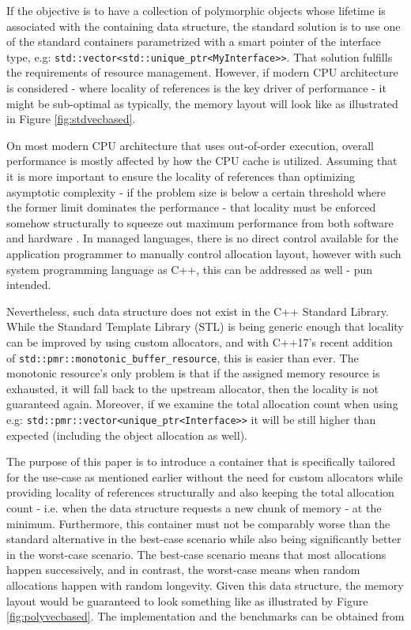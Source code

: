 \documentclass[a4paper,12pt]{article}
\begin{document}

If the objective is to have a collection of polymorphic objects whose lifetime is associated with the containing data structure, the standard solution is to use one of the standard containers parametrized with a smart pointer of the interface type, e.g: \lstinline{std::vector<std::unique_ptr<MyInterface>>}. That solution fulfills the requirements of resource management. However, if modern CPU architecture is considered - where locality of references is the key driver of performance - it might be sub-optimal as typically, the memory layout will look like as illustrated in Figure \ref{fig:stdvecbased}.

On most modern CPU architecture that uses out-of-order execution, overall performance is mostly affected by how the CPU cache is utilized. Assuming that it is more important to ensure the locality of references than optimizing asymptotic complexity - if the problem size is below a certain threshold where the former limit dominates the performance - that locality must be enforced somehow structurally to squeeze out maximum performance from both software and hardware \cite{cache_line_aware_datastructs}. In managed languages, there is no direct control available for the application programmer to manually control allocation layout, however with such system programming language as C++, this can be addressed as well - pun intended. 

Nevertheless, such data structure does not exist in the C++ Standard Library. While the Standard Template Library (STL) is being generic enough that locality can be improved by using custom allocators, and with C++17's recent addition of \lstinline{std::pmr::monotonic_buffer_resource}, this is easier than ever. The monotonic resource's only problem is that if the assigned memory resource is exhausted, it will fall back to the upstream allocator, then the locality is not guaranteed again. Moreover, if we examine the total allocation count when using e.g: \lstinline{std::pmr::vector<unique_ptr<Interface>>} it will be still higher than expected (including the object allocation as well).
 
 The purpose of this paper is to introduce a container that is specifically tailored for the use-case as mentioned earlier without the need for custom allocators while providing locality of references structurally and also keeping the total allocation count - i.e.  when the data structure requests a new chunk of memory - at the minimum. Furthermore, this container must not be comparably worse than the standard alternative in the best-case scenario while also being significantly better in the worst-case scenario. The best-case scenario means that most allocations happen successively, and in contrast, the worst-case means when random allocations happen with random longevity. Given this data structure, the memory layout would be guaranteed to look something like as illustrated by Figure \ref{fig:polyvecbased}. The implementation and the benchmarks can be obtained from \cite{poly_vec_github}
 
\end{document}
